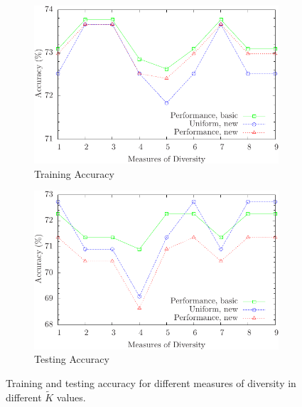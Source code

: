 
\begin{figure} [t]
\centering
\begin{subfigure}{.49\textwidth}
  \centering
  \includegraphics[width=.95\linewidth]{../Figure/diversity_7_others_train}
  \caption{Training Accuracy}
  \label{fig:diversity_0.7_others_train}
\end{subfigure}%
\begin{subfigure}{.49\textwidth}
  \centering
  \includegraphics[width=.95\linewidth]{../Figure/diversity_7_others_test}
  \caption{Testing Accuracy}
  \label{fig:diversity_0.7_others_test}
\end{subfigure}
\caption{Training and testing accuracy for different measures of diversity in different $\tilde{K}$ values.}
\label{fig:diversity_0.7_others}
\end{figure}


